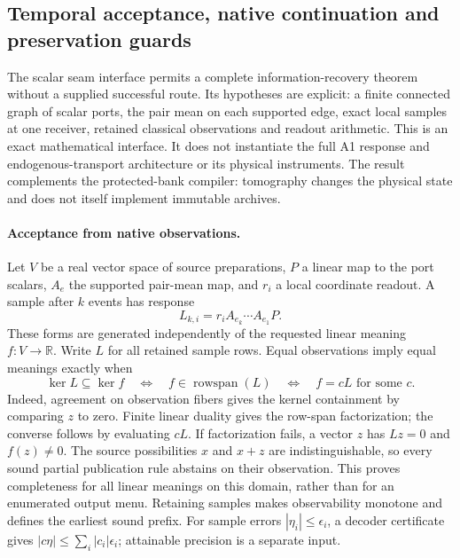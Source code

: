 \subsection{Temporal acceptance, native continuation and preservation guards}
\label{sec:source-temporal-recovery}

The scalar seam interface permits a complete information-recovery theorem
without a supplied successful route. Its hypotheses are explicit: a finite
connected graph of scalar ports, the pair mean on each supported edge, exact
local samples at one receiver, retained classical observations and readout
arithmetic. This is an exact mathematical interface. It does not instantiate
the full A1 response and endogenous-transport architecture or its physical
instruments. The result complements the protected-bank compiler: tomography
changes the physical state and does not itself implement immutable archives.

\paragraph{Acceptance from native observations.}
Let $V$ be a real vector space of source preparations, $P$ a linear map to
the port scalars, $A_e$ the supported pair-mean map, and $r_i$ a local
coordinate readout. A sample after $k$ events has response
\[
 L_{k,i}=r_i A_{e_k}\cdots A_{e_1}P.
\]
These forms are generated independently of the requested linear meaning
$f:V\to\mathbb R$. Write $L$ for all retained sample rows. Equal observations
imply equal meanings exactly when
\[
 \ker L\subseteq\ker f
 \quad\Longleftrightarrow\quad
 f\in\operatorname{rowspan}(L)
 \quad\Longleftrightarrow\quad
 f=cL\text{ for some }c.
\]
Indeed, agreement on observation fibers gives the kernel containment by
comparing $z$ to zero. Finite linear duality gives the row-span
factorization; the converse follows by evaluating $cL$. If factorization
fails, a vector $z$ has $Lz=0$ and $f(z)\ne0$. The source possibilities
$x$ and $x+z$ are indistinguishable, so every sound partial publication
rule abstains on their observation. This proves completeness for all linear
meanings on this domain, rather than for an enumerated output menu. Retaining
samples makes observability monotone and defines the earliest sound prefix.
For sample errors $|\eta_i|\leq\epsilon_i$, a decoder certificate gives
$|c\eta|\leq\sum_i|c_i|\epsilon_i$; attainable precision is a separate input.

